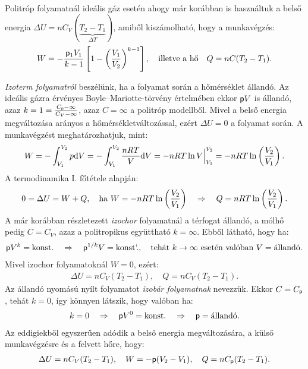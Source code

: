 Politróp folyamatnál ideális gáz esetén ahogy már korábban is használtuk a belső energia $\Delta U=n C_V(\underbrace{T_2-T_1}_{\Delta T})$, amiből kiszámolható, hogy a munkavégzés:
\begin{align}
    W = - \frac{\mathsf p_1V_1}{k-1}\left[{1-\left({\frac{V_1}{V_2}}\right)^{k-1}}\right],\quad\textnormal{illetve a hő}\quad Q=nC(T_2-T_1).
\end{align}

\emph{Izoterm folyamatról} beszélünk, ha a folyamat során a hőmérséklet állandó. Az ideális gázra érvényes Boyle--Mariotte-törvény értelmében ekkor $\mathsf p V$ is állandó, azaz $k = 1 = \frac{C_\mathsf p-\infty}{C_V-\infty}$, azaz $C=\infty$ a politróp modellből. Mivel a belső energia megváltozása arányos a hőmérsékletváltozással, ezért $\Delta U = 0$ a folyamat során. A munkavégzést meghatározhatjuk, mint:
\begin{align}
    W = -\int_{V_1}^{V_2}p\mathrm{d}V = -\int_{V_1}^{V_2} \frac{nRT}{V}\mathrm{d}V = -nRT\ln V\Big|_{V_1}^{V_2}= -nRT\ln\left({\frac{V_2}{V_1}}\right).
\end{align}
A termodinamika I. főtétele alapján:
\begin{align}
    0 = \Delta U = W+Q,\quad\textnormal{ha } W = -nRT\ln\left({\frac{V_2}{V_1}}\right)\quad\Rightarrow\quad Q = nRT\ln\left({\frac{V_2}{V_1}}\right).
\end{align}
A már korábban részletezett \emph{izochor} folyamatnál a térfogat állandó, a mólhő pedig $C=C_V$, azaz a politropikus együttható $k=\infty$. Ebből látható, hogy ha:
\begin{align}
    \mathsf p V^k = \textnormal{konst.}\quad\Rightarrow\quad \mathsf p^{1/k}V = \textnormal{konst'.},\quad \textnormal{tehát } k\to\infty\textnormal{ esetén valóban } V=\textnormal{állandó}.
\end{align}
Mivel izochor folyamatoknál $W=0$, ezért:
\begin{align}
    \Delta U = nC_V(T_2-T_1),\quad Q = nC_V(T_2-T_1).
\end{align}
Az állandó nyomású nyílt folyamatot \emph{izobár folyamatnak} nevezzük. Ekkor $C=C_\mathsf p$, tehát $k=0$, így könnyen látszik, hogy valóban ha:
\begin{align}
    k=0 \quad\Rightarrow\quad \mathsf p V^0=\textnormal{konst.} \quad\Rightarrow\quad \mathsf p = \textnormal{állandó}.
\end{align}
Az eddigiekből egyszerűen adódik a belső energia megváltozására, a külső munkavégzésre és a felvett hőre, hogy:
\begin{align}
    \Delta U = nC_V(T_2-T_1),\quad W = -\mathsf p(V_2-V_1),\quad Q = nC_\mathsf p (T_2-T_1).
\end{align}

